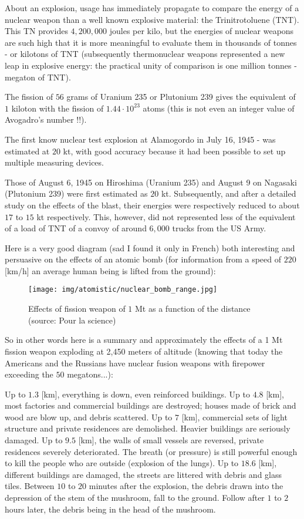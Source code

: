 	About an explosion, usage has immediately propagate to compare the energy of a nuclear weapon than a well known explosive material: the Trinitrotoluene (TNT). This TN provides $4,200,000$ joules per kilo, but the energies of nuclear weapons are such high that it is more meaningful to evaluate them in thousands of tonnes - or kilotons of TNT (subsequently thermonuclear weapons represented a new leap in explosive energy: the practical unity of comparison is one million tonnes - megaton of TNT).
	
	The fission of $56$ grams of Uranium 235 or Plutonium 239 gives the equivalent of $1$ kiloton with the fission of $1.44\cdot 10^{23}$ atoms (this is not even an integer value of Avogadro's number !!).
	
	The first know nuclear test explosion at Alamogordo in July 16, 1945 - was estimated at $20$ kt, with good accuracy because it had been possible to set up multiple measuring devices.
	
	Those of August 6, 1945 on Hiroshima (Uranium 235) and August 9 on Nagasaki (Plutonium 239) were first estimated as $20$ kt. Subsequently, and after a detailed study on the effects of the blast, their energies were respectively reduced to about $17$ to $15$ kt respectively. This, however, did not represented less of the equivalent of a load of TNT of a convoy of around $6,000$ trucks from the US Army.
	
	Here is a very good diagram (sad I found it only in French) both interesting and persuasive on the effects of an atomic bomb (for information from a speed of $220$ [km/h] an average human being is lifted from the ground):
	\begin{figure}[H]
		\begin{center}
		\texttt{[image: img/atomistic/nuclear\_bomb\_range.jpg]}
		\end{center}	
		\caption[Effects of fission weapon of $1$ Mt as a function of the distance]{Effects of fission weapon of $1$ Mt as a function of the distance (source: Pour la science)}
	\end{figure}
	So in other words here is a summary and approximately the effects of a 1 Mt fission weapon exploding at 2,450 meters of altitude (knowing that today the Americans and the Russians have nuclear fusion weapons with firepower exceeding the $50$ megatons...):
	
	Up to $1.3$ [km], everything is down, even reinforced buildings. Up to $4.8$ [km], most factories and commercial buildings are destroyed; houses made of brick and wood are blow up, and debris scattered. Up to $7$ [km], commercial sets of light structure and private residences are demolished. Heavier buildings are seriously damaged. Up to $9.5$ [km], the walls of small vessels are reversed, private residences severely deteriorated. The breath (or pressure) is still powerful enough to kill the people who are outside (explosion of the lungs). Up to $18.6$ [km], different buildings are damaged, the streets are littered with debris and glass tiles. Between $10$ to $20$ minutes after the explosion, the debris drawn into the depression of the stem of the mushroom, fall to the ground. Follow after $1$ to $2$ hours later, the debris being in the head of the mushroom.
	
